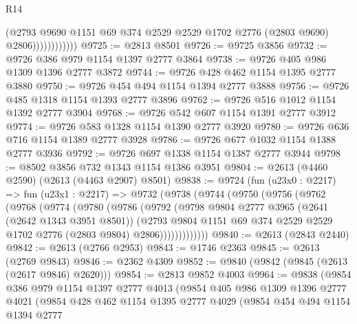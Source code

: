 \begin{lexlean}{R14}
\begin{coremodule}
                          (@2793
                            @9690
                            @1151
                            @69
                            @374
                            @2529
                            @2529
                            @1702
                            @2776
                            (@2803 @9690)
                            @2806))))))))))))
@9725 := @2813 @8501
@9726 := @9725 @3856
@9732 := @9726 @386 @979 @1154 @1397 @2777 @3864
@9738 := @9726 @405 @986 @1309 @1396 @2777 @3872
@9744 := @9726 @428 @462 @1154 @1395 @2777 @3880
@9750 := @9726 @454 @494 @1154 @1394 @2777 @3888
@9756 := @9726 @485 @1318 @1154 @1393 @2777 @3896
@9762 := @9726 @516 @1012 @1154 @1392 @2777 @3904
@9768 := @9726 @542 @607 @1154 @1391 @2777 @3912
@9774 := @9726 @583 @1328 @1154 @1390 @2777 @3920
@9780 := @9726 @636 @716 @1154 @1389 @2777 @3928
@9786 := @9726 @677 @1032 @1154 @1388 @2777 @3936
@9792 := @9726 @697 @1338 @1154 @1387 @2777 @3944
@9798 := @8502 @3856 @732 @1343 @1154 @1386 @3951
@9804 := @2613 (@4460 @2590) (@2613 (@4463 @2907) @8501)
@9838 := @9724
    (fun (u23x0 : @2217) =>
    fun (u23x1 : @2217) =>
    @9732
      (@9738
        (@9744
          (@9750
            (@9756
              (@9762
                (@9768
                  (@9774
                    (@9780
                      (@9786
                        (@9792
                          (@9798
                            @9804
                            @2777
                            @3965
                            (@2641 (@2642 @1343 @3951 @8501))
                            (@2793
                              @9804
                              @1151
                              @69
                              @374
                              @2529
                              @2529
                              @1702
                              @2776
                              (@2803 @9804)
                              @2806)))))))))))))
@9840 := @2613 (@2843 @2440)
@9842 := @2613 (@2766 @2953)
@9843 := @1746 @2363
@9845 := @2613 (@2769 @9843)
@9846 := @2362 @4309
@9852 := @9840 (@9842 (@9845 (@2613 (@2617 @9846) @2620)))
@9854 := @2813 @9852 @4003
@9964 := @9838
    (@9854
      @386
      @979
      @1154
      @1397
      @2777
      @4013
      (@9854
        @405
        @986
        @1309
        @1396
        @2777
        @4021
        (@9854
          @428
          @462
          @1154
          @1395
          @2777
          @4029
          (@9854
            @454
            @494
            @1154
            @1394
            @2777

\end{coremodule}
\end{lexlean}
